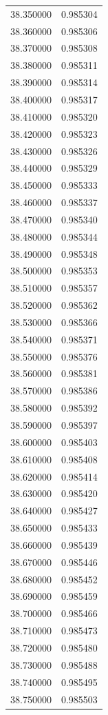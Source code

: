 \begin{tabular}{rr}
38.350000 & 0.985304 \\
38.360000 & 0.985306 \\
38.370000 & 0.985308 \\
38.380000 & 0.985311 \\
38.390000 & 0.985314 \\
38.400000 & 0.985317 \\
38.410000 & 0.985320 \\
38.420000 & 0.985323 \\
38.430000 & 0.985326 \\
38.440000 & 0.985329 \\
38.450000 & 0.985333 \\
38.460000 & 0.985337 \\
38.470000 & 0.985340 \\
38.480000 & 0.985344 \\
38.490000 & 0.985348 \\
38.500000 & 0.985353 \\
38.510000 & 0.985357 \\
38.520000 & 0.985362 \\
38.530000 & 0.985366 \\
38.540000 & 0.985371 \\
38.550000 & 0.985376 \\
38.560000 & 0.985381 \\
38.570000 & 0.985386 \\
38.580000 & 0.985392 \\
38.590000 & 0.985397 \\
38.600000 & 0.985403 \\
38.610000 & 0.985408 \\
38.620000 & 0.985414 \\
38.630000 & 0.985420 \\
38.640000 & 0.985427 \\
38.650000 & 0.985433 \\
38.660000 & 0.985439 \\
38.670000 & 0.985446 \\
38.680000 & 0.985452 \\
38.690000 & 0.985459 \\
38.700000 & 0.985466 \\
38.710000 & 0.985473 \\
38.720000 & 0.985480 \\
38.730000 & 0.985488 \\
38.740000 & 0.985495 \\
38.750000 & 0.985503 \\

\end{tabular}

